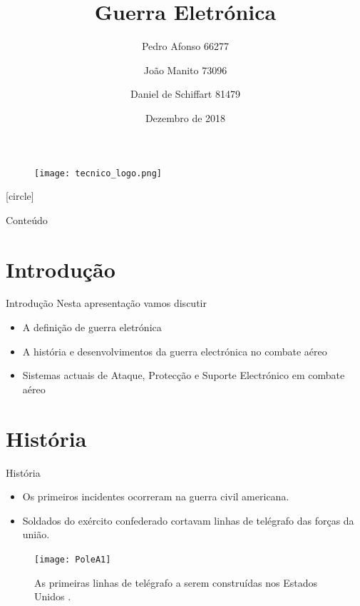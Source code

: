 \documentclass[portuguese,10pt]{beamer}
\title[Guerra Eletrónica]{Guerra Eletrónica}
\author[MEAer -- Sistemas Aviónicos Integrados]{Pedro Afonso 66277 \and João Manito 73096 \and Daniel de Schiffart 81479}
\institute{Sistemas Aviónicos Integrados}
\date{Dezembro de 2018}
\begin{document}
\begin{frame}
    \begin{figure}
	\texttt{[image: tecnico\_logo.png]}
    \end{figure}
    \titlepage
\end{frame}

[circle]

\begin{frame}{Conteúdo}
  \tableofcontents
\end{frame}

\section{Introdução}

\begin{frame}{Introdução}
    Nesta apresentação vamos discutir
    \begin{itemize}
        \item A definição de guerra eletrónica
        \item A história e desenvolvimentos da guerra electrónica no combate aéreo
        \item Sistemas actuais de Ataque, Protecção e Suporte Electrónico em combate aéreo
    \end{itemize}
\end{frame}

\section{História}

\begin{frame}{História}
    \begin{itemize}
        \item Os primeiros incidentes ocorreram na guerra civil americana.
        \pause
        \item Soldados do exército confederado cortavam linhas de telégrafo das forças da união.
    \end{itemize}
    \begin{figure}[]
        \centering
        \texttt{[image: PoleA1]}
        \caption{As primeiras linhas de telégrafo a serem construídas nos Estados Unidos \cite{polea1}.}
        \label{fig:polea1}
    \end{figure}
\end{frame}
\end{document}
